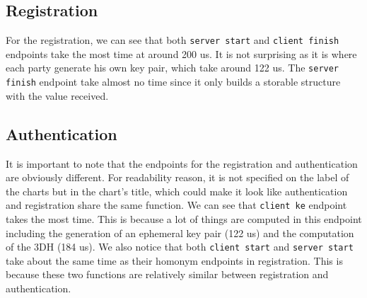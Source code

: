 ﻿\documentclass[../report.tex]{subfiles}
\begin{document}
\subsection*{Registration}
For the registration, we can see that both \verb|server start| and \verb|client finish| endpoints take the most time at around 200 us.
It is not surprising as it is where each party generate his own key pair, which take around 122 us.
The \verb|server finish| endpoint take almost no time since it only builds a storable structure with the value received.

\subsection*{Authentication}
It is important to note that the endpoints for the registration and authentication are obviously different. For readability reason, it is not specified on the label of the charts but in the chart's title, which could make it look like authentication and registration share the same function.
We can see that \verb|client ke| endpoint takes the most time. This is because a lot of things are computed in this endpoint including the generation of an ephemeral key pair (122 us) and the computation of the 3DH (184 us).
We also notice that both \verb|client start| and \verb|server start| take about the same time as their homonym endpoints in registration. This is because these two functions are relatively similar between registration and authentication.
\end{document}
